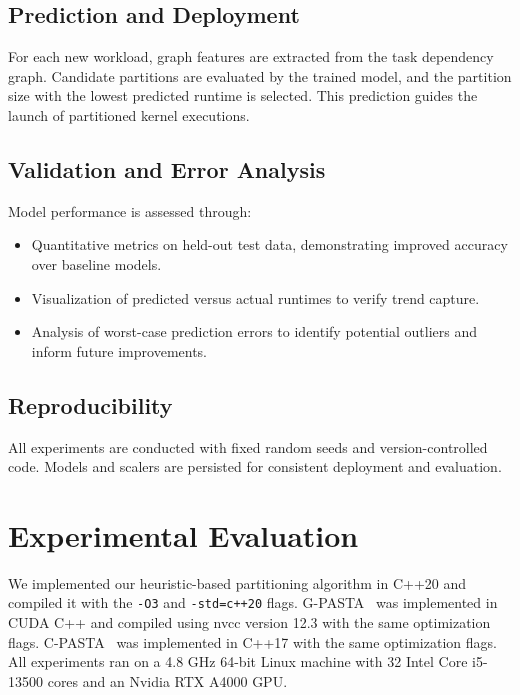 \documentclass[9pt,conference]{IEEEtran}
\begin{document}
\subsection{Prediction and Deployment}
For each new workload, graph features are extracted from the task dependency graph. Candidate partitions are evaluated by the trained model, and the partition size with the lowest predicted runtime is selected. This prediction guides the launch of partitioned kernel executions.

\subsection{Validation and Error Analysis}
Model performance is assessed through:
\begin{itemize}
    \item Quantitative metrics on held-out test data, demonstrating improved accuracy over baseline models.
    \item Visualization of predicted versus actual runtimes to verify trend capture.
    \item Analysis of worst-case prediction errors to identify potential outliers and inform future improvements.
\end{itemize}

\subsection{Reproducibility}
All experiments are conducted with fixed random seeds and version-controlled code. Models and scalers are persisted for consistent deployment and evaluation.

\section{Experimental Evaluation}

We implemented our heuristic-based partitioning algorithm in C++20 and compiled it with the \texttt{-O3} and \texttt{-std=c++20} flags. 
G-PASTA~\cite{zhang2024g} was implemented in CUDA C++ and compiled using nvcc version 12.3 with the same optimization flags. 
C-PASTA~\cite{cpasta} was implemented in C++17 with the same optimization flags. 
All experiments ran on a 4.8 GHz 64-bit Linux machine with 32 Intel Core i5-13500 cores and an Nvidia RTX A4000 GPU. 
\end{document}
